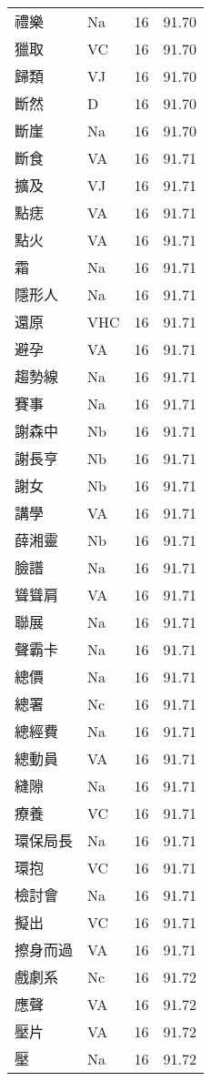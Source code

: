 \documentclass[twocolumn]{book}
\begin{document}
\begin{supertabular}{llrr}
禮樂 & Na & 16 &  91.70\\
獵取 & VC & 16 &  91.70\\
歸類 & VJ & 16 &  91.70\\
斷然 & D & 16 &  91.70\\
斷崖 & Na & 16 &  91.70\\
斷食 & VA & 16 &  91.71\\
擴及 & VJ & 16 &  91.71\\
點痣 & VA & 16 &  91.71\\
點火 & VA & 16 &  91.71\\
霜 & Na & 16 &  91.71\\
隱形人 & Na & 16 &  91.71\\
還原 & VHC & 16 &  91.71\\
避孕 & VA & 16 &  91.71\\
趨勢線 & Na & 16 &  91.71\\
賽事 & Na & 16 &  91.71\\
謝森中 & Nb & 16 &  91.71\\
謝長亨 & Nb & 16 &  91.71\\
謝女 & Nb & 16 &  91.71\\
講學 & VA & 16 &  91.71\\
薛湘靈 & Nb & 16 &  91.71\\
臉譜 & Na & 16 &  91.71\\
聳聳肩 & VA & 16 &  91.71\\
聯展 & Na & 16 &  91.71\\
聲霸卡 & Na & 16 &  91.71\\
總價 & Na & 16 &  91.71\\
總署 & Nc & 16 &  91.71\\
總經費 & Na & 16 &  91.71\\
總動員 & VA & 16 &  91.71\\
縫隙 & Na & 16 &  91.71\\
療養 & VC & 16 &  91.71\\
環保局長 & Na & 16 &  91.71\\
環抱 & VC & 16 &  91.71\\
檢討會 & Na & 16 &  91.71\\
擬出 & VC & 16 &  91.71\\
擦身而過 & VA & 16 &  91.71\\
戲劇系 & Nc & 16 &  91.72\\
應聲 & VA & 16 &  91.72\\
壓片 & VA & 16 &  91.72\\
壓 & Na & 16 &  91.72\\

\end{supertabular}
\end{document}

